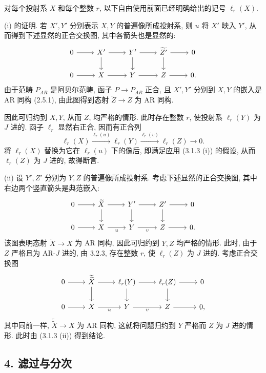 \begin{prooftext}[证明]
对每个投射系 $X$ 和每个整数 $r$, 以下自由使用前面已经明确给出的记号 $\ell_r(X)$.

(i) 的证明. 若 $X',Y'$ 分别表示 $X,Y$ 的普遍像所成投射系, 则 $u$ 将 $X'$ 映入 $Y'$, 从而得到下述显然的正合交换图, 其中各箭头也是显然的:
\[
\begin{tikzcd}
0 \arrow[r] & X' \arrow[r] \arrow[d] & Y' \arrow[r] \arrow[d] & \widetilde{Z'} \arrow[r] \arrow[d] & 0\\
0 \arrow[r] & X \arrow[r] & Y \arrow[r] & Z \arrow[r] & 0 .
\end{tikzcd}
\]
由于范畴 $P_{AR}$ 是阿贝尔范畴, 函子 $P\to P_{AR}$ 正合, 且 $X',Y'$ 分别到 $X,Y$ 的嵌入是 AR 同构 (2.5.1), 由此图得到态射 $\widetilde Z\to Z$ 为 AR 同构.

因此可归约到 $X,Y$, 从而 $Z$, 均严格的情形. 此时存在整数 $r$, 使投射系 $\ell_r(Y)$ 为 $J$ 进的. 函子 $\ell_r$ 显然右正合, 因而有正合列
\[
\ell_r(X)\stackrel{\ell_r(u)}{\longrightarrow}\ell_r(Y)\stackrel{\ell_r(v)}{\longrightarrow}\ell_r(Z)\longrightarrow0.
\]
将 $\ell_r(X)$ 替换为它在 $\ell_r(u)$ 下的像后, 即满足应用 (3.1.3 (i)) 的假设, 从而 $\ell_r(Z)$ 为 $J$ 进的, 故得断言.

(ii) 设 $Y',Z'$ 分别为 $Y,Z$ 的普遍像所成投射系. 考虑下述显然的正合交换图, 其中右边两个竖直箭头是典范嵌入:
\[
\begin{tikzcd}
0 \arrow[r] & \widetilde X \arrow[r] \arrow[d] & Y' \arrow[r] \arrow[d] & Z' \arrow[r] \arrow[d] & 0\\
0 \arrow[r] & X \arrow[r,"u"'] & Y \arrow[r,"v"'] & Z \arrow[r] & 0 .
\end{tikzcd}
\]
该图表明态射 $\widetilde X\to X$ 为 AR 同构, 因此可归约到 $Y,Z$ 均严格的情形. 此时, 由于 $Z$ 严格且为 AR-$J$ 进的, 由 3.2.3, 存在整数 $r$, 使 $\ell_r(Z)$ 为 $J$ 进的. 考虑正合交换图
\[
\begin{tikzcd}
0 \arrow[r] & \widetilde{\widetilde X} \arrow[r] \arrow[d] & \ell_r(Y) \arrow[r] \arrow[d] & \ell_r(Z) \arrow[r] \arrow[d] & 0\\
0 \arrow[r] & X \arrow[r,"u"'] & Y \arrow[r,"v"'] & Z \arrow[r] & 0,
\end{tikzcd}
\]
其中同前一样, $\widetilde{\widetilde X}\to X$ 为 AR 同构, 这就将问题归约到 $Y$ 严格而 $Z$ 为 $J$ 进的情形. 此时由 (3.1.3 (ii)) 得到结论.
\end{prooftext}

\subsection*{4. 滤过与分次}
